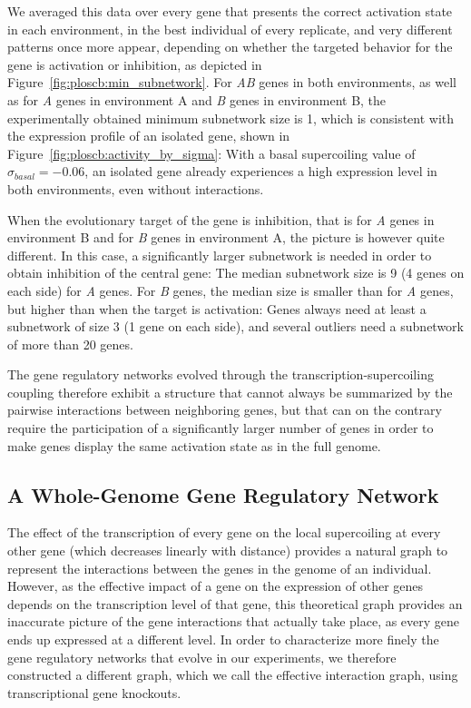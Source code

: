 We averaged this data over every gene that presents the correct activation state in each environment, in the best individual of every replicate, and very different patterns once more appear, depending on whether the targeted behavior for the gene is activation or inhibition, as depicted in Figure~\ref{fig:ploscb:min_subnetwork}.
For \emph{AB} genes in both environments, as well as for \emph{A} genes in environment A and \emph{B} genes in environment B, the experimentally obtained minimum subnetwork size is 1, which is consistent with the expression profile of an isolated gene, shown in Figure~\ref{fig:ploscb:activity_by_sigma}: With a basal supercoiling value of $\sigma_{basal} = -0.06$, an isolated gene already experiences a high expression level in both environments, even without interactions.

When the evolutionary target of the gene is inhibition, that is for \emph{A} genes in environment B and for \emph{B} genes in environment A, the picture is however quite different.
In this case, a significantly larger subnetwork is needed in order to obtain inhibition of the central gene: The median subnetwork size is 9 (4 genes on each side) for \emph{A} genes.
For \emph{B} genes, the median size is smaller than for \emph{A} genes, but higher than when the target is activation: Genes always need at least a subnetwork of size 3 (1 gene on each side), and several outliers need a subnetwork of more than 20 genes.

The gene regulatory networks evolved through the transcription-supercoiling coupling therefore exhibit a structure that cannot always be summarized by the pairwise interactions between neighboring genes, but that can on the contrary require the participation of a significantly larger number of genes in order to make genes display the same activation state as in the full genome.


\subsection{A Whole-Genome Gene Regulatory Network}

The effect of the transcription of every gene on the local supercoiling at every other gene (which decreases linearly with distance) provides a natural graph to represent the interactions between the genes in the genome of an individual.
However, as the effective impact of a gene on the expression of other genes depends on the transcription level of that gene, this theoretical graph provides an inaccurate picture of the gene interactions that actually take place, as every gene ends up expressed at a different level.
In order to characterize more finely the gene regulatory networks that evolve in our experiments, we therefore constructed a different graph, which we call the effective interaction graph, using transcriptional gene knockouts.

